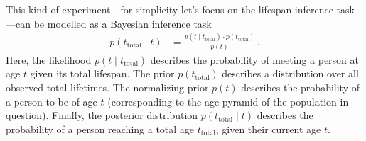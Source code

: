 \documentclass[a4paper,11pt]{article}
\begin{document}
This kind of experiment---for simplicity let's focus on the lifespan inference task---can be modelled as a Bayesian inference task
\begin{align}
	p(t_\mathrm{total} \mid t) &= \frac{p(t \mid t_\mathrm{total}) \cdot p(t_\mathrm{total})}{p(t)}\,.
	\label{eqn:bayesian_model}
\end{align}
Here, the likelihood $p(t \mid t_\mathrm{total})$ describes the probability of meeting a person at age $t$ given its total lifespan. The prior $p(t_\mathrm{total})$ describes a distribution over all observed total lifetimes. The normalizing prior $p(t)$ describes the probability of a person to be of age $t$ (corresponding to the age pyramid of the population in question). Finally, the posterior distribution $p(t_\mathrm{total} \mid t)$ describes the probability of a person reaching a total age $t_\mathrm{total}$, given their current age $t$.
\end{document}
